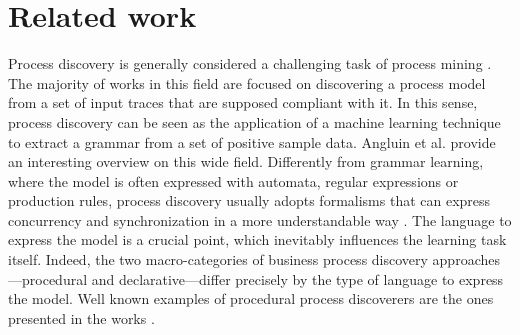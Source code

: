 
\section{Related work}
\label{sec:related}

Process discovery is generally considered a challenging task of process mining \cite{2012-Maggi}. The majority of works in this field are focused on discovering a process model from a set of input traces that are supposed compliant with it. In this sense, process discovery can be seen as the application of a machine learning technique to extract a grammar from a set of positive sample data. Angluin et al. \cite{1983-Angliun} provide an interesting overview on this wide field.
Differently from grammar learning, where the model is often expressed with automata, regular expressions or production rules, process discovery usually adopts formalisms that can express concurrency and synchronization in a more understandable way \cite{2009-Goedertier}. 
The language to express the model is a crucial point, which inevitably influences the learning task itself. Indeed, the two macro-categories of business process discovery approaches---procedural and declarative---differ precisely by the type of language to express the model. 
Well known examples of procedural process discoverers are the ones presented in the works \cite{2003-Weijters,2004-Aalst,2007-Gunther,2010-Aalst,2013-Leemans,2015-Guo,2017-Augusto}.
